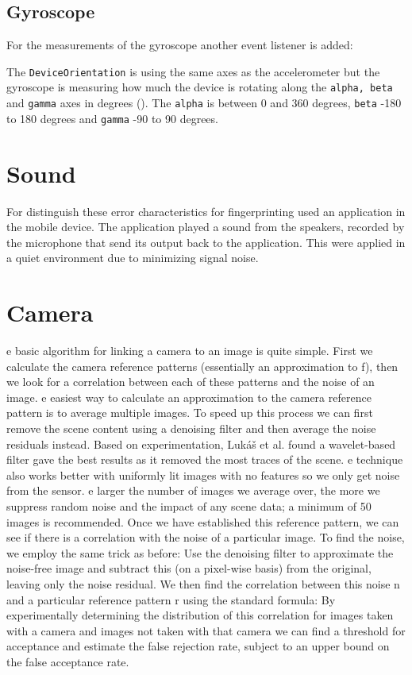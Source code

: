 \subsection{Gyroscope}
For the measurements of the gyroscope another event listener is added:

The \texttt{DeviceOrientation} is using the same axes as the accelerometer but the gyroscope is measuring how much the device is rotating along the \texttt{alpha, beta} and \texttt{gamma} axes in degrees (). The \texttt{alpha} is between 0 and 360 degrees, \texttt{beta} -180 to 180 degrees and \texttt{gamma} -90 to 90 degrees. \citet{sensor:DeviceOrientation:spec}

\section{Sound}\label{sec:test:sound}
For distinguish these error characteristics for fingerprinting \cite[]{sensor:micSpek} used an application in the mobile device. The application played a sound from the speakers, recorded by the microphone that send its output back to the application. This were applied in a quiet environment due to minimizing signal noise.

\section{Camera}\label{sec:test:camera}
e basic algorithm for linking a camera to an image is quite simple. First we calculate the camera reference patterns (essentially an approximation to f), then we look for a correlation between each of these patterns and the noise of an image. e easiest way to calculate an approximation to the camera reference pattern is to average multiple images. To speed up this process we can first remove the scene content using a denoising filter and then average the noise residuals instead. Based on experimentation, Lukáš et al. found a wavelet-based filter gave the best results as it removed the most traces of the scene. e technique also works better with uniformly lit images with no features so we only get noise from the sensor. e larger the number of images we average over, the more we suppress random noise
and the impact of any scene data; a minimum of 50 images is recommended. Once we have established this reference pattern, we can see if there is a correlation with the noise of a particular image. To find the noise, we employ the same trick as before: Use the denoising filter to approximate the noise-free image and subtract this (on a pixel-wise basis) from the original, leaving only the noise residual. We then find the correlation between this noise n and a particular reference pattern r using the standard formula:
By experimentally determining the distribution of this correlation for images taken with a camera and images not taken with that camera we can find a threshold for acceptance and estimate the false rejection rate, subject to an upper bound on
the false acceptance rate. \cite[p.2]{sensor:camera:DCIdent}

